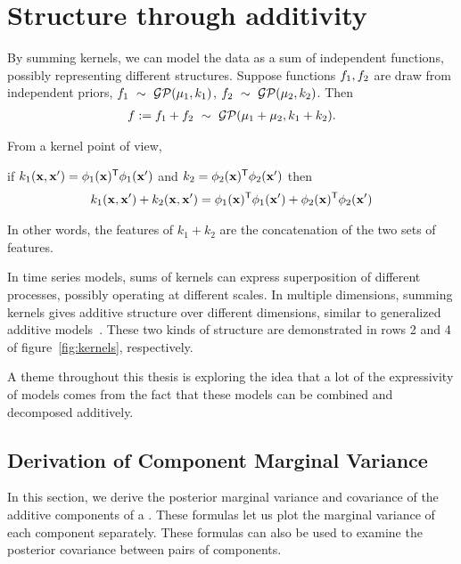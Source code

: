 \section{Structure through additivity}


By summing kernels, we can model the data as a sum of independent functions, possibly representing different structures.
Suppose functions ${f_1, f_2}$ are draw from independent \gp{} priors, ${f_1 \ \sim\  \mathcal{GP}(\mu_1, k_1)}$, ${f_2 \ \sim\  \mathcal{GP}(\mu_2, k_2)}$.
Then 
%
\begin{align}
f := f_1 + f_2 \ \sim\  \mathcal{GP}(\mu_1 + \mu_2, k_1 + k_2).
\end{align}

From a kernel point of view,

if $k_1({\bf{x}}, {\bf{x}}') = \phi_1({\bf{x}}){^\mathsf{T}} \phi_1({\bf{x}}')$ and $k_2 = \phi_2({\bf{x}}){^\mathsf{T}} \phi_2({\bf{x}}')$
then
%
\begin{align}
k_1({\bf{x}}, {\bf{x}}') + k_2({\bf{x}}, {\bf{x}}') = \phi_1({\bf{x}}){^\mathsf{T}} \phi_1({\bf{x}}') + \phi_2({\bf{x}}){^\mathsf{T}} \phi_2({\bf{x}}')
\end{align}

In other words, the features of $k_1 + k_2$ are the concatenation of the two sets of features.


In time series models, sums of kernels can express superposition of different processes, possibly operating at different scales.
In multiple dimensions, summing kernels gives additive structure over different dimensions, similar to generalized additive models~\citep{hastie1990generalized}.
These two kinds of structure are demonstrated in rows 2 and 4 of figure~\ref{fig:kernels}, respectively.



A theme throughout this thesis is exploring the idea that a lot of the expressivity of \gp{} models comes from the fact that these models can be combined and decomposed additively.


\subsection{Derivation of Component Marginal Variance}

In this section, we derive the posterior marginal variance and covariance of the additive components of a \gp{}.  These formulas let us plot the marginal variance of each component separately.  These formulas can also be used to examine the posterior covariance between pairs of components.

